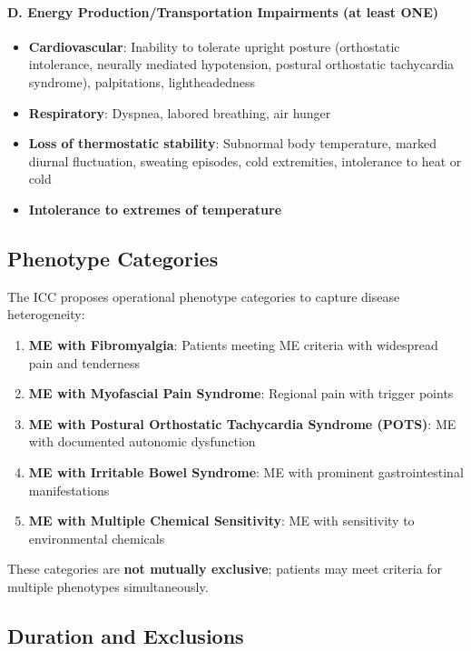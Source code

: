 \begin{requirement}
\paragraph{D. Energy Production/Transportation Impairments (at least ONE)}

\begin{itemize}
    \item \textbf{Cardiovascular}: Inability to tolerate upright posture (orthostatic intolerance, neurally mediated hypotension, postural orthostatic tachycardia syndrome), palpitations, lightheadedness
    \item \textbf{Respiratory}: Dyspnea, labored breathing, air hunger
    \item \textbf{Loss of thermostatic stability}: Subnormal body temperature, marked diurnal fluctuation, sweating episodes, cold extremities, intolerance to heat or cold
    \item \textbf{Intolerance to extremes of temperature}
\end{itemize}
\end{requirement}

\subsection{Phenotype Categories}

The ICC proposes operational phenotype categories to capture disease heterogeneity:

\begin{enumerate}
    \item \textbf{ME with Fibromyalgia}: Patients meeting ME criteria with widespread pain and tenderness
    \item \textbf{ME with Myofascial Pain Syndrome}: Regional pain with trigger points
    \item \textbf{ME with Postural Orthostatic Tachycardia Syndrome (POTS)}: ME with documented autonomic dysfunction
    \item \textbf{ME with Irritable Bowel Syndrome}: ME with prominent gastrointestinal manifestations
    \item \textbf{ME with Multiple Chemical Sensitivity}: ME with sensitivity to environmental chemicals
\end{enumerate}

These categories are \textbf{not mutually exclusive}; patients may meet criteria for multiple phenotypes simultaneously.

\subsection{Duration and Exclusions}

